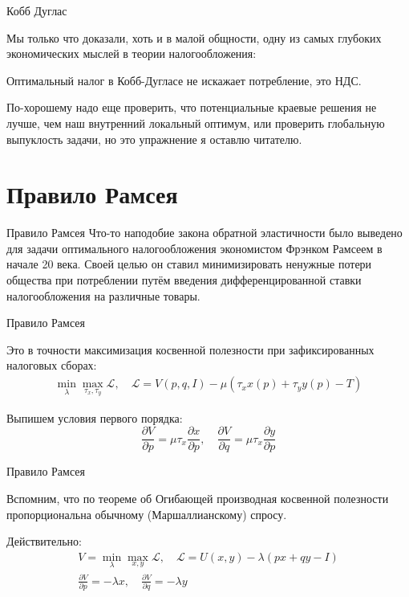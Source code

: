 \documentclass{beamer}
\begin{document}
\begin{frame}{Кобб Дуглас}

Мы только что доказали, хоть и в малой общности, одну из самых глубоких экономических мыслей в теории налогообложения:

\begin{lemma}
Оптимальный налог в Кобб-Дугласе не искажает потребление, это НДС.
\end{lemma}

По-хорошему надо еще проверить, что потенциальные краевые решения не лучше, чем наш внутренний локальный оптимум, или проверить глобальную выпуклость задачи, но это упражнение я оставлю читателю.

\end{frame}

\section{Правило Рамсея}

\begin{frame}{Правило Рамсея}
Что-то наподобие закона обратной эластичности было выведено для задачи оптимального налогообложения экономистом Фрэнком Рамсеем в начале 20 века. Своей целью он ставил минимизировать ненужные потери общества при потреблении путём введения дифференцированной ставки налогообложения на различные товары. 
\end{frame}

\begin{frame}{Правило Рамсея}

Это в точности максимизация косвенной полезности при зафиксированных налоговых сборах:
\begin{gather*}
\min_{\lambda} \max_{\tau_x, \tau_y} \mathcal{L}, \quad \mathcal{L} = V(p,q,I) - \mu (\tau_x x(p) + \tau_y y(p) - T)
\end{gather*}

Выпишем условия первого порядка:
$$\frac{\partial V}{\partial p} = \mu \tau_x \frac{\partial x}{\partial p}, \quad \frac{\partial V}{\partial q} = \mu \tau_x \frac{\partial y}{\partial p}$$

\end{frame}

\begin{frame}{Правило Рамсея}

Вспомним, что по теореме об Огибающей производная косвенной полезности пропорциональна обычному (Маршаллианскому) спросу. 

Действительно:
\begin{gather*}
V = \min_{\lambda} \max_{x,y} \mathcal{L}, \quad \mathcal{L} = U(x, y) - \lambda (p x + q y - I) \\
\frac{\partial V}{\partial p} = - \lambda x, \quad \frac{\partial V}{\partial q} = - \lambda y
\end{gather*}

\end{frame}
\end{document}
